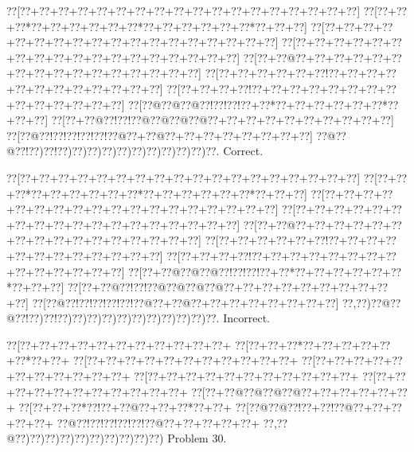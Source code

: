 \documentclass[a5paper]{article}
\begin{document}
\begin{center}
{\goo
\0??[\0??+\0??+\0??+\0??+\0??+\0??+\0??+\0??+\0??+\0??+\0??+\0??+\0??+\0??+\0??+\0??+\0??+\0??]
\0??[\0??+\0??+\0??*\0??+\0??+\0??+\0??+\0??+\0??*\0??+\0??+\0??+\0??+\0??+\0??*\0??+\0??+\0??]
\0??[\0??+\0??+\0??+\0??+\0??+\0??+\0??+\0??+\0??+\0??+\0??+\0??+\0??+\0??+\0??+\0??+\0??+\0??]
\0??[\0??+\0??+\0??+\0??+\0??+\0??+\0??+\0??+\0??+\0??+\0??+\0??+\0??+\0??+\0??+\0??+\0??+\0??]
\0??[\0??+\0??@\0??+\0??+\0??+\0??+\0??+\0??+\0??+\0??+\0??+\0??+\0??+\0??+\0??+\0??+\0??+\0??]
\0??[\0??+\0??+\0??+\0??+\0??+\0??!\0??+\0??+\0??+\0??+\0??+\0??+\0??+\0??+\0??+\0??+\0??+\0??]
\0??[\0??+\0??+\0??+\0??!\0??+\0??+\0??+\0??+\0??+\0??+\0??+\0??+\0??+\0??+\0??+\0??+\0??+\0??]
\0??[\0??@\0??@\0??@\0??!\0??!\0??!\0??+\0??*\0??+\0??+\0??+\0??+\0??+\0??*\0??+\0??+\0??]
\0??[\0??+\0??@\0??!\0??!\0??@\0??@\0??@\0??@\0??+\0??+\0??+\0??+\0??+\0??+\0??+\0??+\0??+\0??]
\0??[\0??@\0??!\0??!\0??!\0??!\0??!\0??@\0??+\0??@\0??+\0??+\0??+\0??+\0??+\0??+\0??+\0??]
\0??@\0??@\0??!\0??)\0??!\0??)\0??)\0??)\0??)\0??)\0??)\0??)\0??)\0??)\0??)\0??.
}
Correct. 

\end{center}
\begin{center}
{\goo
\0??[\0??+\0??+\0??+\0??+\0??+\0??+\0??+\0??+\0??+\0??+\0??+\0??+\0??+\0??+\0??+\0??+\0??+\0??]
\0??[\0??+\0??+\0??*\0??+\0??+\0??+\0??+\0??+\0??*\0??+\0??+\0??+\0??+\0??+\0??*\0??+\0??+\0??]
\0??[\0??+\0??+\0??+\0??+\0??+\0??+\0??+\0??+\0??+\0??+\0??+\0??+\0??+\0??+\0??+\0??+\0??+\0??]
\0??[\0??+\0??+\0??+\0??+\0??+\0??+\0??+\0??+\0??+\0??+\0??+\0??+\0??+\0??+\0??+\0??+\0??+\0??]
\0??[\0??+\0??@\0??+\0??+\0??+\0??+\0??+\0??+\0??+\0??+\0??+\0??+\0??+\0??+\0??+\0??+\0??+\0??]
\0??[\0??+\0??+\0??+\0??+\0??+\0??!\0??+\0??+\0??+\0??+\0??+\0??+\0??+\0??+\0??+\0??+\0??+\0??]
\0??[\0??+\0??+\0??+\0??!\0??+\0??+\0??+\0??+\0??+\0??+\0??+\0??+\0??+\0??+\0??+\0??+\0??+\0??]
\0??[\0??+\0??@\0??@\0??@\0??!\0??!\0??!\0??+\0??*\0??+\0??+\0??+\0??+\0??+\0??*\0??+\0??+\0??]
\0??[\0??+\0??@\0??!\0??!\0??@\0??@\0??@\0??@\0??+\0??+\0??+\0??+\0??+\0??+\0??+\0??+\0??+\0??]
\0??[\0??@\0??!\0??!\0??!\0??!\0??!\0??@\0??+\0??@\0??+\0??+\0??+\0??+\0??+\0??+\0??+\0??]
\0??,\0??)\0??@\0??@\0??!\0??)\0??!\0??)\0??)\0??)\0??)\0??)\0??)\0??)\0??)\0??)\0??)\0??.
}
Incorrect. 

\end{center}
\newpage
\begin{center}
{\goo
\0??[\0??+\0??+\0??+\0??+\0??+\0??+\0??+\0??+\0??+\0??+\0??+
\0??[\0??+\0??+\0??*\0??+\0??+\0??+\0??+\0??+\0??*\0??+\0??+
\0??[\0??+\0??+\0??+\0??+\0??+\0??+\0??+\0??+\0??+\0??+\0??+
\0??[\0??+\0??+\0??+\0??+\0??+\0??+\0??+\0??+\0??+\0??+\0??+
\0??[\0??+\0??+\0??+\0??+\0??+\0??+\0??+\0??+\0??+\0??+\0??+
\0??[\0??+\0??+\0??+\0??+\0??+\0??+\0??+\0??+\0??+\0??+\0??+
\0??[\0??+\0??@\0??@\0??@\0??@\0??+\0??+\0??+\0??+\0??+\0??+
\0??[\0??+\0??+\0??*\0??!\0??+\0??@\0??+\0??+\0??*\0??+\0??+
\0??[\0??@\0??@\0??!\0??+\0??!\0??@\0??+\0??+\0??+\0??+\0??+
\0??@\0??!\0??!\0??!\0??!\0??!\0??@\0??+\0??+\0??+\0??+\0??+
\0??,\0??@\0??)\0??)\0??)\0??)\0??)\0??)\0??)\0??)\0??)\0??)
}
Problem 30.

\end{center}
\end{document}
